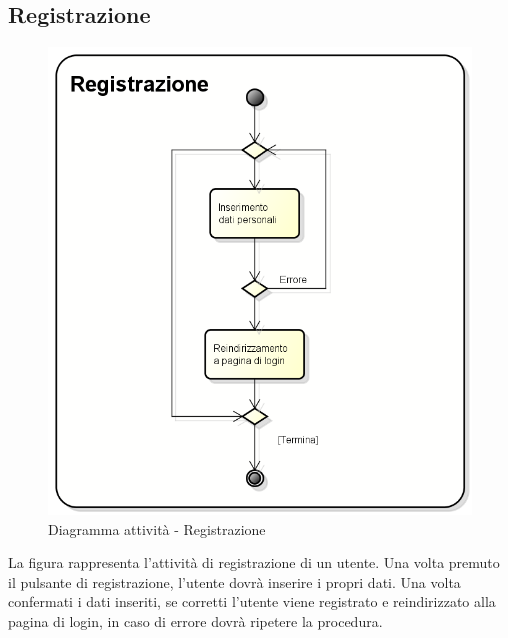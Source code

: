 \subsection{Registrazione}
\begin{figure}[h] 
	\centering 
	\includegraphics[scale=0.6] {img/activity_registrazione.png}
	\caption{Diagramma attività - Registrazione} 
\end{figure}
La figura rappresenta l'attività di registrazione di un utente. Una volta premuto il pulsante di registrazione, l'utente dovrà inserire i propri dati. Una volta confermati i dati inseriti, se corretti l'utente viene registrato e reindirizzato alla pagina di login, in caso di errore dovrà ripetere la procedura.
\newpage


